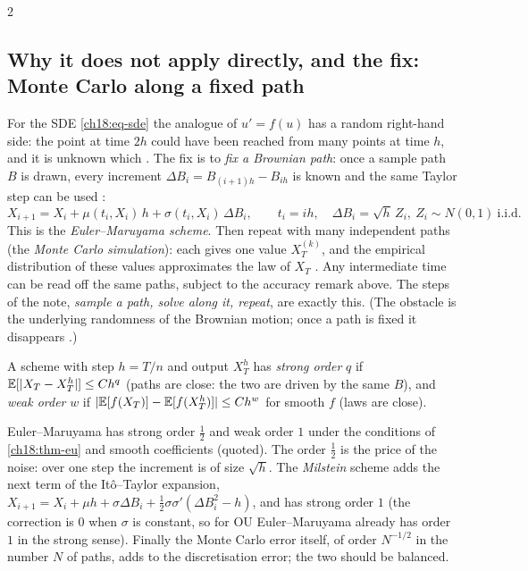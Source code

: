 \begin{paracol}{2}
\subsection{Why it does not apply directly, and the fix: Monte Carlo along a fixed path}
For the SDE \eqref{ch18:eq-sde} the analogue of $u'=f(u)$ has a random right-hand side: the point at time $2h$ could have been reached from many points at time $h$, and it is unknown which . The fix is to \emph{fix a Brownian path}: once a sample path $B$ is drawn, every increment $\Delta B_i=B_{(i+1)h}-B_{ih}$ is known and the same Taylor step can be used :
\begin{equation}\label{ch18:eq-em}
  X_{i+1}=X_i+\mu(t_i,X_i)\,h+\sigma(t_i,X_i)\,\Delta B_i,\qquad t_i=ih,\quad\Delta B_i=\sqrt h\,Z_i,\ Z_i\sim N(0,1)\ \text{i.i.d.}
\end{equation}
This is the \emph{Euler--Maruyama scheme}. Then repeat with many independent paths (the \emph{Monte Carlo simulation}): each gives one value $X_T^{(k)}$, and the empirical distribution of these values approximates the law of $X_T$ . Any intermediate time can be read off the same paths, subject to the accuracy remark above. The steps of the note, \emph{sample a path, solve along it, repeat}, are exactly this. (The obstacle is the underlying randomness of the Brownian motion; once a path is fixed it disappears .)

\begin{definition}\label{ch18:def-conv}
A scheme with step $h=T/n$ and output $X^h_T$ has \emph{strong order} $q$ if $\mathbb{E}[|X_T-X^h_T|]\le Ch^q$ (paths are close: the two are driven by the same $B$), and \emph{weak order} $w$ if $|\mathbb{E}[f(X_T)]-\mathbb{E}[f(X^h_T)]|\le Ch^w$ for smooth $f$ (laws are close).
\end{definition}
Euler--Maruyama has strong order $\tfrac12$ and weak order $1$ under the conditions of \cref{ch18:thm-eu} and smooth coefficients (quoted). The order $\tfrac12$ is the price of the noise: over one step the increment is of size $\sqrt h$. The \emph{Milstein} scheme adds the next term of the It\^o--Taylor expansion, $X_{i+1}=X_i+\mu h+\sigma\Delta B_i+\tfrac12\sigma\sigma'(\Delta B_i^2-h)$, and has strong order $1$ (the correction is $0$ when $\sigma$ is constant, so for OU Euler--Maruyama already has order $1$ in the strong sense). Finally the Monte Carlo error itself, of order $N^{-1/2}$ in the number $N$ of paths, adds to the discretisation error; the two should be balanced.


\end{paracol}

